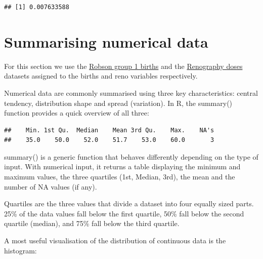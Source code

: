 \documentclass[
]{book}
\newenvironment{Shaded}{\begin{snugshade}}{\end{snugshade}}
\newcommand{\CommentTok}[1]{\textcolor[rgb]{0.56,0.35,0.01}{\textit{#1}}}
\newcommand{\FunctionTok}[1]{\textcolor[rgb]{0.13,0.29,0.53}{\textbf{#1}}}
\newcommand{\NormalTok}[1]{#1}
\newcommand{\SpecialCharTok}[1]{\textcolor[rgb]{0.81,0.36,0.00}{\textbf{#1}}}
\begin{document}
\begin{verbatim}
## [1] 0.007633588
\end{verbatim}

\section{Summarising numerical data}\label{summarising-numerical-data}

For this section we use the \hyperref[robson-group-1-births]{Robson group 1 births} and the \hyperref[renography-doses]{Renography doses} datasets assigned to the births and reno variables respectively.

Numerical data are commonly summarised using three key characteristics: central tendency, distribution shape and spread (variation). In R, the summary() function provides a quick overview of all three:

\begin{Shaded}
\end{Shaded}

\begin{verbatim}
##    Min. 1st Qu.  Median    Mean 3rd Qu.    Max.    NA's 
##    35.0    50.0    52.0    51.7    53.0    60.0       3
\end{verbatim}

summary() is a generic function that behaves differently depending on the type of input. With numerical input, it returns a table displaying the minimum and maximum values, the three quartiles (1st, Median, 3rd), the mean and the number of NA values (if any).

Quartiles are the three values that divide a dataset into four equally sized parts. 25\% of the data values fall below the first quartile, 50\% fall below the second quartile (median), and 75\% fall below the third quartile.

A most useful visualisation of the distribution of continuous data is the histogram:

\begin{Shaded}
\end{Shaded}
\end{document}
